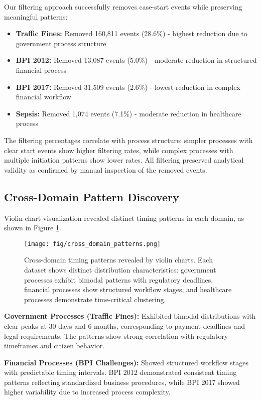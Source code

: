 Our filtering approach successfully removes case-start events while preserving meaningful patterns:

\begin{itemize}
    \item \textbf{Traffic Fines:} Removed 160,811 events (28.6\%) - highest reduction due to government process structure
    \item \textbf{BPI 2012:} Removed 13,087 events (5.0\%) - moderate reduction in structured financial process
    \item \textbf{BPI 2017:} Removed 31,509 events (2.6\%) - lowest reduction in complex financial workflow
    \item \textbf{Sepsis:} Removed 1,074 events (7.1\%) - moderate reduction in healthcare process
\end{itemize}

The filtering percentages correlate with process structure: simpler processes with clear start events show higher filtering rates, while complex processes with multiple initiation patterns show lower rates. All filtering preserved analytical validity as confirmed by manual inspection of the removed events.

\subsection{Cross-Domain Pattern Discovery}
\label{subsec:patterns}

Violin chart visualization revealed distinct timing patterns in each domain, as shown in Figure \ref{fig:cross_domain_patterns}.

\begin{figure}[H]
\centering
\texttt{[image: fig/cross\_domain\_patterns.png]}
\caption{Cross-domain timing patterns revealed by violin charts. Each dataset shows distinct distribution characteristics: government processes exhibit bimodal patterns with regulatory deadlines, financial processes show structured workflow stages, and healthcare processes demonstrate time-critical clustering.}
\label{fig:cross_domain_patterns}
\end{figure}

\textbf{Government Processes (Traffic Fines):} Exhibited bimodal distributions with clear peaks at 30 days and 6 months, corresponding to payment deadlines and legal requirements. The patterns show strong correlation with regulatory timeframes and citizen behavior.

\textbf{Financial Processes (BPI Challenges):} Showed structured workflow stages with predictable timing intervals. BPI 2012 demonstrated consistent timing patterns reflecting standardized business procedures, while BPI 2017 showed higher variability due to increased process complexity.


